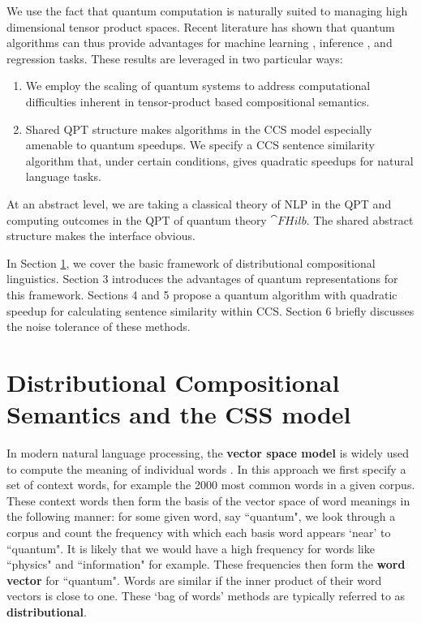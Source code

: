 We use the fact that quantum computation is naturally suited to managing high dimensional tensor product spaces. Recent literature has shown that quantum algorithms can thus provide advantages for machine learning \cite{wiebe2014quantum,rebentrost2014quantum}, inference \cite{low2014quantum}, and regression \cite{wiebe2012quantum,wang2014quantum} tasks.  These results are leveraged in two particular ways:
\begin{enumerate}
\item We employ the scaling of quantum systems to address computational difficulties  inherent in tensor-product based compositional semantics.
\item Shared QPT structure makes algorithms in the CCS model especially amenable to quantum speedups.  We specify a CCS sentence similarity algorithm that, under certain conditions, gives quadratic speedups for natural language tasks.
\end{enumerate}
At an abstract level, we are taking a classical theory of NLP in the QPT  and computing outcomes in the QPT of quantum theory $\cat{FHilb}$. The shared abstract structure makes the interface obvious.

In Section \ref{sec:disco}, we cover the basic framework of distributional compositional linguistics. Section 3 introduces the advantages of quantum representations for this framework.  Sections 4 and 5 propose a quantum algorithm with quadratic speedup for calculating sentence similarity within CCS. Section 6 briefly discusses the noise tolerance of these methods.

\section{Distributional Compositional Semantics and the CSS model}
\label{sec:disco}
In modern natural language processing, the \textbf{vector space model} is widely used to compute the meaning of individual words \cite{schutze1998automatic}. In this approach we first specify a set of context words, for example the 2000 most common words in a given corpus.  These context words then form the basis of the vector space of word meanings in the following manner: for some given word, say  ``quantum", we look through a corpus and count the frequency with which each basis word    appears `near' to ``quantum". It is likely that we would have a high frequency for words like ``physics" and ``information" for example.  These frequencies then form the \textbf{word vector} for ``quantum". Words are similar if the inner product of their word vectors is close to one. These `bag of words' methods are typically referred to as \textbf{distributional}.

